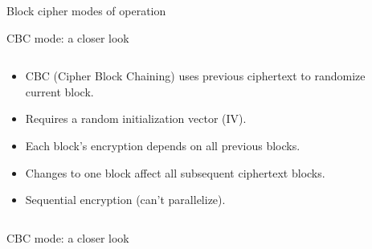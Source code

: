 \documentclass[aspectratio=169, lualatex, handout]{beamer}
\begin{document}
\begin{frame}{Block cipher modes of operation}
\end{frame}

\begin{frame}{CBC mode: a closer look}
	\begin{columns}[c]
		\begin{column}{0.6\textwidth}
			\begin{itemize}
				\item CBC (Cipher Block Chaining) uses previous ciphertext to randomize current block.
				\item Requires a random initialization vector (IV).
				\item Each block's encryption depends on all previous blocks.
				\item Changes to one block affect all subsequent ciphertext blocks.
				\item Sequential encryption (can't parallelize).
			\end{itemize}
		\end{column}
		\begin{column}{0.4\textwidth}
		\end{column}
	\end{columns}
\end{frame}

\begin{frame}{CBC mode: a closer look}
	\vspace{-0.3cm}
\end{frame}
\end{document}

